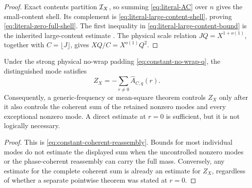 \begin{proof}
Exact contents partition \(\mathcal I_X\), so summing
\eqref{eq:literal-AC} over \(n\) gives the small-content shell.  Its
complement is \eqref{eq:literal-large-content-shell}, proving
\eqref{eq:literal-zero-full-shell}.  The first inequality in
\eqref{eq:literal-large-content-bound} is the inherited
large-content estimate \citep{WangTPC30,WangTPC32}.  The physical
scale relation \(JQ=X^{1+o(1)}\), together with
\(C=\lfloor J\rfloor\), gives
\(XQ/C=X^{o(1)}Q^2\).
\end{proof}

\begin{corollary}
\label{cor:generic-coherent-completion}
Under the strong physical no-wrap padding
\eqref{eq:constant-no-wrap-q}, the distinguished mode satisfies
\[
 Z_X=-\sum_{r\ne0}\widehat A_{C,q}(r).
\]
Consequently, a generic-frequency or mean-square theorem controls
\(Z_X\) only after it also controls the coherent sum of the retained
nonzero modes and every exceptional nonzero mode.  A direct estimate
at \(r=0\) is sufficient, but it is not logically necessary.
\end{corollary}

\begin{proof}
This is \eqref{eq:constant-coherent-reassembly}.  Bounds for most
individual modes do not estimate the displayed sum when the
uncontrolled nonzero modes or the phase-coherent reassembly can carry
the full mass.  Conversely, any estimate for the complete coherent
sum is already an estimate for \(Z_X\), regardless of whether a
separate pointwise theorem was stated at \(r=0\).
\end{proof}
